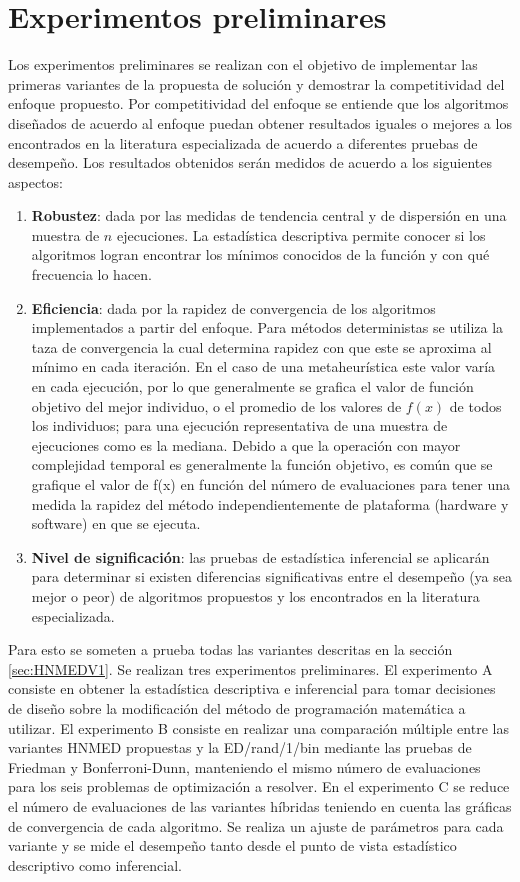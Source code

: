 \section{Experimentos preliminares}
Los experimentos preliminares se realizan con el objetivo de implementar las primeras variantes de la propuesta de solución y demostrar la competitividad del enfoque propuesto. Por competitividad del enfoque se entiende que los algoritmos diseñados de acuerdo al enfoque puedan obtener resultados iguales o mejores a los encontrados en la literatura especializada de acuerdo a diferentes pruebas de desempeño. Los resultados obtenidos serán medidos de acuerdo a los siguientes aspectos:
\begin{enumerate}
	\item \textbf{Robustez}: dada por las medidas de tendencia central y de dispersión en una muestra de $n$ ejecuciones. La estadística descriptiva permite conocer si los algoritmos logran encontrar los mínimos conocidos de la función y con qué frecuencia lo hacen. 
	\item \textbf{Eficiencia}: dada por la rapidez de convergencia de los algoritmos implementados a partir del enfoque. Para métodos deterministas se utiliza la taza de convergencia la cual determina rapidez con que este se aproxima al mínimo en cada iteración. En el caso de una metaheurística este valor varía en cada ejecución, por lo que generalmente se grafica el valor de función objetivo del mejor individuo, o el promedio de los valores de $f(x)$ de todos los individuos; para una ejecución representativa de una muestra de ejecuciones como es la mediana. Debido a que la operación con mayor complejidad temporal es generalmente la función objetivo, es común que se grafique el valor de f(x) en función del número de evaluaciones para tener una medida la rapidez del método independientemente de plataforma (hardware y software) en que se ejecuta.  
	\item \textbf{Nivel de significación}: las pruebas de estadística inferencial se aplicarán para determinar si existen diferencias significativas entre el desempeño (ya sea mejor o peor) de algoritmos propuestos y los encontrados en la literatura especializada.
\end{enumerate}

Para esto se someten a prueba todas las variantes descritas en la sección \ref{sec:HNMEDV1}. Se realizan tres experimentos preliminares. El experimento A  consiste en obtener la estadística descriptiva e inferencial para tomar decisiones de diseño sobre la modificación del método de programación matemática a utilizar.
El experimento B consiste en realizar una comparación múltiple entre las variantes HNMED propuestas y la ED/rand/1/bin mediante las pruebas de Friedman y Bonferroni-Dunn, manteniendo el mismo número de evaluaciones para los seis problemas de optimización a resolver. 
En el experimento C se reduce el número de evaluaciones de las variantes híbridas teniendo en cuenta las gráficas de convergencia de cada algoritmo. Se realiza un ajuste de parámetros para cada variante y se mide el desempeño tanto desde el punto de vista estadístico descriptivo como inferencial.

